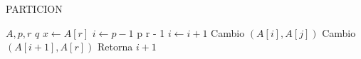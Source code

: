 \documentclass[final,a4paper,romanappendices]{IEEEtran}\usepackage[]{graphicx}\usepackage[]{color}
\theoremstyle{definition}
\begin{document}
\begin{algorithm}[ht]
\caption{PARTICION}
\begin{algorithmic}[1]
	\Require $A,p,r$
	\Ensure $q$
		\State $x \gets A[r]$
		\State $i \gets p-1$
		 {p} {r - 1}		
				\State $i \gets i+1$
				\State Cambio $(A[i] , A[j])$
				\State Cambio $(A[i+1] , A[r])$
			\EndIf
	\EndFor
	\State Retorna $i+1$

\end{algorithmic}
\end{algorithm}



\nocite{*}
\printbibliography
\end{document}
